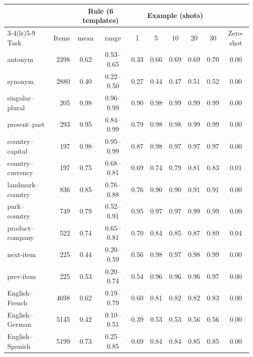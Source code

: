 \begin{tabular}{@{}lrcccccccc@{}}
\toprule
 & & \multicolumn{2}{c}{Rule (6 templates)} & \multicolumn{5}{c}{Example (shots)} & \\
\cmidrule(lr){3-4}\cmidrule(lr){5-9}
Task & Items & mean & range & 1 & 5 & 10 & 20 & 30 & Zero-shot \\
\midrule
antonym & 2398 & 0.62 & 0.53--0.65 & 0.33 & 0.66 & 0.69 & 0.69 & 0.70 & 0.00 \\
synonym & 2880 & 0.40 & 0.22--0.50 & 0.27 & 0.44 & 0.47 & 0.51 & 0.52 & 0.00 \\
singular--plural & 205 & 0.98 & 0.96--0.99 & 0.90 & 0.98 & 0.99 & 0.99 & 0.99 & 0.00 \\
present--past & 293 & 0.95 & 0.84--0.99 & 0.79 & 0.98 & 0.98 & 0.99 & 0.99 & 0.00 \\
country--capital & 197 & 0.98 & 0.95--0.99 & 0.87 & 0.98 & 0.97 & 0.97 & 0.97 & 0.00 \\
country--currency & 197 & 0.75 & 0.68--0.81 & 0.69 & 0.74 & 0.79 & 0.81 & 0.83 & 0.01 \\
landmark--country & 836 & 0.85 & 0.76--0.88 & 0.76 & 0.90 & 0.90 & 0.91 & 0.91 & 0.00 \\
park--country & 749 & 0.79 & 0.52--0.91 & 0.95 & 0.97 & 0.97 & 0.99 & 0.99 & 0.00 \\
product--company & 522 & 0.74 & 0.65--0.81 & 0.70 & 0.84 & 0.85 & 0.87 & 0.89 & 0.04 \\
next-item & 225 & 0.44 & 0.20--0.59 & 0.56 & 0.98 & 0.97 & 0.98 & 0.99 & 0.00 \\
prev-item & 225 & 0.53 & 0.20--0.74 & 0.54 & 0.96 & 0.96 & 0.96 & 0.97 & 0.00 \\
English--French & 4698 & 0.62 & 0.19--0.79 & 0.60 & 0.81 & 0.82 & 0.82 & 0.83 & 0.00 \\
English--German & 5145 & 0.42 & 0.10--0.51 & 0.39 & 0.53 & 0.53 & 0.56 & 0.56 & 0.00 \\
English--Spanish & 5199 & 0.73 & 0.25--0.85 & 0.69 & 0.84 & 0.84 & 0.85 & 0.85 & 0.00 \\
\bottomrule
\end{tabular}
